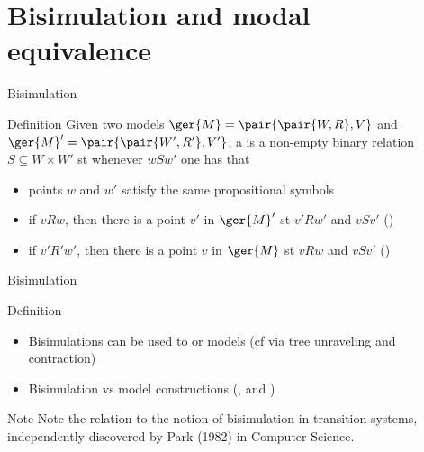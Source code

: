 \documentclass{beamer}
\begin{document}
\section{Bisimulation and modal equivalence}
\begin{slide}{Bisimulation}\label{s:29}
\small
\begin{block}{Definition}
Given two models $\ger{M} = \pair{\pair{W, R}, V}$ and $\ger{M}' = \pair{\pair{W', R'}, V'}$, a  is a non-empty binary relation
$S \subseteq W \times W'$  st whenever $w S w'$ one has that
\begin{itemize}
\item points $w$ and $w'$ satisfy the same propositional symbols
\item if $v R w$, then there is a point $v'$ in $\ger{M}'$ st  $v' R w'$ and $v S v'$ \hspace{0.3cm} ()
\item if $v' R' w'$, then there is a point $v$ in $\ger{M}$ st  $v R w$ and $v S v'$ \hspace{0.3cm} ()
\end{itemize}
\end{block}
\end{slide}

\begin{slide}{Bisimulation}\label{s:30}
\small
\begin{block}{Definition}
\begin{itemize}
\item Bisimulations can be used to  or  models (cf via  tree unraveling and contraction)
\item Bisimulation vs model constructions (,  and )
\end{itemize}
\end{block}
\begin{block}{Note}
Note the relation to the notion of bisimulation in transition systems, independently discovered by Park (1982) in Computer Science.
\end{block}
\end{slide}
\end{document}
